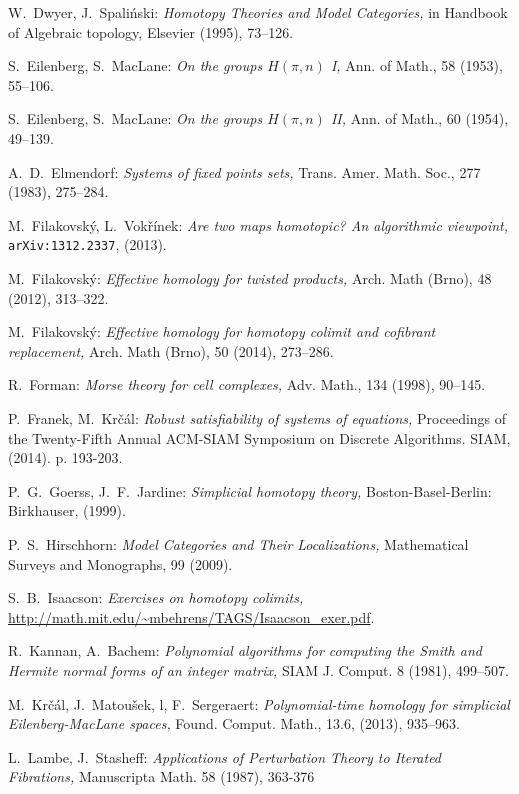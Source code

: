 \documentclass[12pt,a4wide]{article}
\theoremstyle{plain}
\theoremstyle{definition}
\renewcommand\:{\colon}
\begin{document}
\begin{thebibliography}{99}
W.~Dwyer, J.~Spali\'{n}ski:
\emph{Homotopy Theories and Model Categories,}
in Handbook of Algebraic topology, Elsevier (1995), 73--126.

S.~Eilenberg, S.~MacLane:
\emph{On the groups $H(\pi, n)$ I,}
Ann. of Math.,  58 (1953),  55--106.

S.~Eilenberg, S.~MacLane:
\emph{On the groups $H(\pi, n)$ II,}
Ann. of Math., { 60} (1954), 49--139.

A.~D.~Elmendorf:
\emph{Systems of fixed points sets,}
Trans. Amer. Math. Soc., 277 (1983), 275--284.

M.~Filakovsk\'{y}, L.~Vok\v{r}\'{i}nek:
\emph{Are two maps homotopic? An algorithmic viewpoint,}
\verb+arXiv:1312.2337+, (2013).

M.~Filakovsk\'{y}:
\emph{Effective homology for twisted products,} Arch. Math (Brno),  48 (2012), 313--322.

M.~Filakovsk\'{y}:
\emph{Effective homology for homotopy colimit and cofibrant replacement,} Arch. Math (Brno),  50 (2014), 273--286.

R.~Forman:
\emph{Morse theory for cell complexes,} Adv. Math.,  134 (1998), 90--145.


P.~Franek, M.~Kr\v{c}\'{a}l:
\emph{Robust satisfiability of systems of equations,}
Proceedings of the Twenty-Fifth Annual ACM-SIAM Symposium on Discrete Algorithms. SIAM, (2014). p. 193-203.

P.~G.~Goerss, J.~F.~Jardine:
\emph{Simplicial homotopy theory,}
Boston-Basel-Berlin: Birkhauser, (1999).


P.~S.~Hirschhorn:
\emph{Model Categories and Their Localizations,}
Mathematical Surveys and Monographs, 99 (2009).

S.~B.~Isaacson:
\emph{Exercises on homotopy colimits,}
\url{http://math.mit.edu/~mbehrens/TAGS/Isaacson_exer.pdf}.

R.~Kannan, A.~Bachem:
\emph{Polynomial algorithms for computing the Smith and Hermite normal forms of an integer matrix,} 
SIAM J. Comput. 8 (1981), 499--507.

M.~Kr\v{c}\'{a}l, J.~Matou\v{s}ek, l, F.~Sergeraert:
\emph{Polynomial-time homology for simplicial Eilenberg-MacLane spaces,}
Found. Comput. Math., 13.6, (2013), 935--963.

L.~Lambe, J.~Stasheff:
\emph{Applications of Perturbation Theory to Iterated Fibrations,} 
Manuscripta Math. 58 (1987), 363-376


\end{thebibliography}
\end{document}
